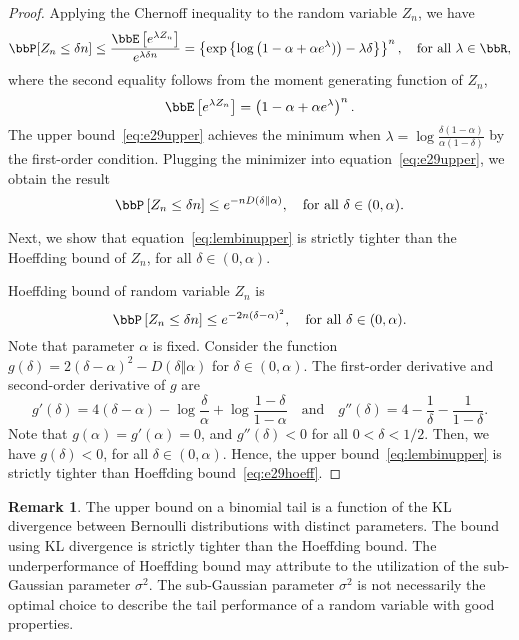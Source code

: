 \documentclass[11pt]{article}
\newcommand{\of}[1]{\left(#1\right)}
\newcommand{\off}[1]{\left[#1\right]}
\newcommand{\offf}[1]{\left\{#1\right\}}
\theoremstyle{plain}
\theoremstyle{definition}
\newtheorem{rmk}{Remark}
\begin{document}
\begin{proof}
    Applying the Chernoff inequality to the random variable $Z_n$, we have
    \begin{equation}\label{eq:e29upper}
    	\bbP[Z_n \leq \delta n] \leq \frac{\bbE\off{e^{\lambda Z_n}}}{e^{\lambda \delta n}} = \offf {\exp \offf{\log \of{1 - \alpha + \alpha e^{\lambda})}- \lambda \delta }}^n,\quad \text{for all } \lambda \in \bbR,
    \end{equation}
    where the second equality follows from the moment generating function of $Z_n$,
    \[\bbE\off{e^{\lambda Z_n}} = \of{1 - \alpha + \alpha e^{\lambda}}^n. \]
    The upper bound~\eqref{eq:e29upper} achieves the minimum when $\lambda = \log {\frac{\delta(1-\alpha)}{\alpha(1 - \delta)}}$ by the first-order condition. Plugging the minimizer into equation~\eqref{eq:e29upper}, we obtain the result
    \[ \bbP\off{Z_n \leq \delta n}  \leq e^{-n D\of{\delta \Vert \alpha}}, \quad \text{for all }\delta \in (0,\alpha).  \]
    
    \vspace{0.2cm}
    Next, we show that equation~\eqref{eq:lembinupper} is strictly tighter than the Hoeffding bound of $Z_n$, for all $\delta \in (0,\alpha)$.
    
    \vspace{0.2cm}
    Hoeffding bound of random variable $Z_n$ is 
    \begin{equation}\label{eq:e29hoeff}
    	\bbP\off{Z_n \leq \delta n} \leq e^{ {-2n(\delta - \alpha)^2}}, \quad \text{for all }\delta \in (0,\alpha).
    \end{equation}
    Note that parameter $\alpha$ is fixed. Consider the function $g(\delta) = 2(\delta - \alpha)^2 - D\of{\delta \Vert \alpha}$ for $\delta \in (0,\alpha)$. The first-order derivative and  second-order derivative of $g$ are
    \[ g'(\delta) = 4(\delta - \alpha) - \log \frac{\delta}{\alpha} + \log \frac{1-\delta}{1-\alpha} \quad \text{and} \quad g''(\delta) = 4 - \frac{1}{\delta} - \frac{1}{1-\delta}. \] 
    Note that $ g(\alpha) = g'(\alpha) = 0$, and $g''(\delta) < 0$ for all $0 < \delta < 1/2$. Then, we have $g(\delta) < 0$, for all $\delta \in (0,\alpha)$. Hence, the upper bound~\eqref{eq:lembinupper} is strictly tighter than Hoeffding bound~\eqref{eq:e29hoeff}.
    
\end{proof}

\begin{rmk}
	The upper bound on a binomial tail is a function of the KL divergence between Bernoulli distributions with distinct parameters. The bound using KL divergence is strictly tighter than the Hoeffding bound. The underperformance of Hoeffding bound may attribute to the utilization of the sub-Gaussian parameter $\sigma^2$. The sub-Gaussian parameter $\sigma^2$ is not necessarily the optimal choice to describe the tail performance of a random variable with good properties. 
\end{rmk}
\end{document}

